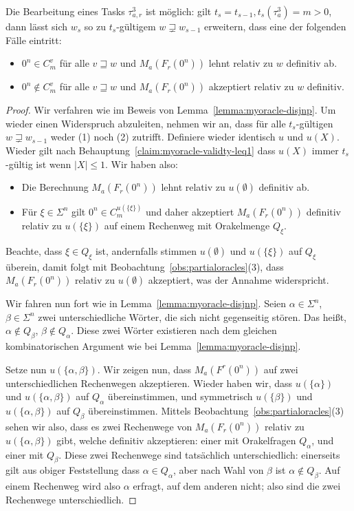 \begin{lemma}\label{lemma:myoracle-up}
    Die Bearbeitung eines Tasks $\tau^3_{a,r}$ ist möglich: gilt $t_s=t_{s-1}, t_{s}(\tau^3_{a})=m>0$, dann lässt sich $w_{s}$ so zu $t_{s}$-gültigem $w\sqsupsetneq w_{s-1}$ erweitern, dass eine der folgenden Fälle eintritt:
        \begin{itemize}[nosep,endpenalty=10000]
            \item $0^n\in C_m^v$ für alle $v\sqsupseteq w$ und $M_a(F_r(0^n))$ lehnt relativ zu $w$ definitiv ab.
            \item $0^n\not\in C_m^v$ für alle $v\sqsupseteq w$ und $M_a(F_r(0^n))$ akzeptiert relativ zu $w$ definitiv.
        \end{itemize}
\end{lemma}
\begin{proof}
Wir verfahren wie im Beweis von Lemma~\ref{lemma:myoracle-disjnp}.
Um wieder einen Widerspruch abzuleiten, nehmen wir an, dass für alle $t_{s}$-gültigen $w\sqsupsetneq w_{s-1}$ weder (1) noch (2) zutrifft.
Definiere wieder identisch $u$ und $u(X)$.
Wieder gilt nach Behauptung~\ref{claim:myoracle-validty-leq1} dass $u(X)$ immer $t_{s}$-gültig ist wenn $|X|\leq 1$.
Wir haben also:
\begin{itemize}[nosep]
    \item Die Berechnung $M_a(F_r(0^n))$ lehnt relativ zu $u(\emptyset)$ definitiv ab.
    \item Für $\xi\in \Sigma^{n}$ gilt $0^n\in C_m^{u(\{\xi\})}$ und daher akzeptiert $M_a(F_r(0^n))$ definitiv relativ zu $u(\{\xi\})$ auf einem Rechenweg mit Orakelmenge $Q_\xi$.
\end{itemize}

Beachte, dass $\xi\in Q_\xi$ ist, andernfalls stimmen $u(\emptyset)$ und $u(\{\xi\})$ auf $Q_\xi$ überein, damit folgt mit Beobachtung~\ref{obs:partialoracles}(3), dass $M_a(F_r(0^n))$ relativ zu $u(\emptyset)$ akzeptiert, was der Annahme widerspricht.

Wir fahren nun fort wie in Lemma~\ref{lemma:myoracle-disjnp}.
Seien $\alpha\in\Sigma^{n}$, $\beta\in\Sigma^{n}$ zwei unterschiedliche Wörter, die sich nicht gegenseitig stören. Das heißt, $\alpha\not\in Q_\beta$, $\beta\not\in Q_\alpha$.
Diese zwei Wörter existieren nach dem gleichen kombinatorischen Argument wie bei Lemma~\ref{lemma:myoracle-disjnp}.

Setze nun $u(\{\alpha, \beta\})$. Wir zeigen nun, dass $M_a(F^r(0^n))$ auf zwei unterschiedlichen Rechenwegen akzeptieren.
Wieder haben wir, dass $u(\{\alpha\})$ und $u(\{\alpha, \beta\})$ auf $Q_\alpha$ übereinstimmen, und symmetrisch $u(\{\beta\})$ und $u(\{\alpha, \beta\})$ auf $Q_\beta$ übereinstimmen.
Mittels Beobachtung~\ref{obs:partialoracles}(3) sehen wir also, dass es zwei Rechenwege von $M_a(F_r(0^n))$ relativ zu $u(\{\alpha, \beta\})$ gibt, welche definitiv akzeptieren: einer mit Orakelfragen $Q_\alpha$, und einer mit $Q_\beta$.
Diese zwei Rechenwege sind tatsächlich unterschiedlich:
einerseits gilt aus obiger Feststellung dass $\alpha\in Q_\alpha$, aber nach Wahl von $\beta$ ist $\alpha\not\in Q_\beta$. Auf einem Rechenweg wird also $\alpha$ erfragt, auf dem anderen nicht; also sind die zwei Rechenwege unterschiedlich.



\end{proof}
